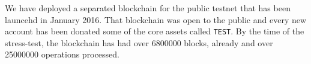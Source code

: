 We have deployed a separated blockchain for the public testnet that has been
launcehd in January 2016. That blockchain was open to the public and every new
account has been donated some of the core assets called \texttt{TEST}. By the
time of the stress-test, the blockchain has had over \num{6800000} blocks,
already and over \num{25000000} operations processed.
